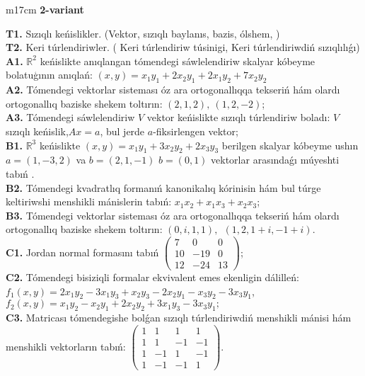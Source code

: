 \documentclass{article}
\begin{document}
\begin{tabular}{m{17cm}}
\textbf{2-variant}
\newline

\textbf{T1.} Sızıqlı keńislikler.   (Vektor,  sızıqlı baylanıs, bazis, ólshem, )  \\
\textbf{T2.} Keri túrlendiriwler. ( Keri túrlendiriw túsinigi,   Keri túrlendiriwdiń sızıqlılıǵı) \\
\textbf{A1.} \(\mathbb{R}^{2}\) keńislikte anıqlangan tómendegi sáwlelendiriw skalyar kóbeyme bolatuģının anıqlań: \((x,y) = x_{1}y_{1} + 2x_{2}y_{1} + 2x_{1}y_{2} + 7x_{2}y_{2}\) \\
\textbf{A2.} Tómendegi vektorlar sisteması óz ara ortogonallıqqa tekseriń hám olardı ortogonallıq baziske shekem toltırın: \((2,1,2),\ (1,2, - 2)\); \\
\textbf{A3.} Tómendegi sáwlelendiriw \(V\) vektor keńislikte sızıqlı túrlendiriw boladı: \(V\) sızıqlı keńislik,\(Ax = a\), bul jerde \(a\)-fiksirlengen vektor; \\
\textbf{B1.} \(\mathbb{R}^{3}\) keńislikte \((x,y) = x_{1}y_{1} + 3x_{2}y_{2} + 2x_{3}y_{3}\) berilgen skalyar kóbeyme ushın \(a = (1, - 3,2)\) va \(b = (2,1, - 1)\) \(b = (0,1)\) vektorlar arasındaǵı múyeshti tabıń . \\
\textbf{B2.} Tómendegi kvadratlıq formanıń kanonikalıq kórinisin hám bul túrge keltiriwshi menshikli mánislerin tabıń: \(x_{1}x_{2} + x_{1}x_{3} + x_{2}x_{3}\); \\
\textbf{B3.} Tómendegi vektorlar sisteması óz ara ortogonallıqqa tekseriń hám olardı ortogonallıq baziske shekem toltırın: \((0,i,1,1),\ \ (1,2,1 + i, - 1 + i)\). \\
\textbf{C1.} Jordan normal formasını tabıń \(\begin{pmatrix} 7 & 0 & 0 \\ 10 & - 19 & 0 \\ 12 & - 24 & 13 \end{pmatrix}\); \\
\textbf{C2.} Tómendegi bisiziqli formalar ekvivalent emes ekenligin dálilleń:\(f_{1}(x,y) = 2x_{1}y_{2} - 3x_{1}y_{3} + x_{2}y_{3} - 2x_{2}y_{1} - x_{3}y_{2} - 3x_{3}y_{1}\),\(f_{2}(x,y) = x_{1}y_{2} - x_{2}y_{1} + 2x_{2}y_{2} + 3x_{1}y_{3} - 3x_{3}y_{1};\) \\
\textbf{C3.} Matricası tómendegishe bolǵan sızıqlı túrlendiriwdiń menshikli mánisi hám menshikli vektorların tabıń: \(\begin{pmatrix} 1 & 1 & 1 & 1 \\ 1 & 1 & - 1 & - 1 \\ 1 & - 1 & 1 & - 1 \\ 1 & - 1 & - 1 & 1 \end{pmatrix}\). \\

\end{tabular}
\vspace{1cm}
\end{document}
